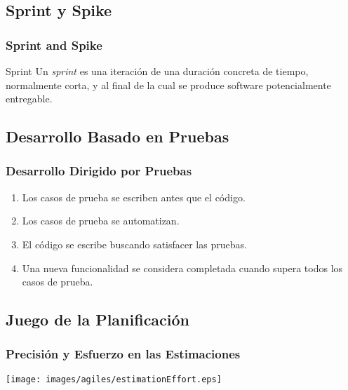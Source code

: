 \documentclass[animated,a4paper,slidestop,xcolor=pst,blue]{beamer}
\begin{document}
\subsection{Sprint y Spike}

\begin{frame}[c]
    \frametitle{Sprint and Spike}
    \begin{block}{Sprint}
        Un \emph{sprint} es una iteración de una duración concreta de tiempo, normalmente corta, y al final de la cual se produce software potencialmente entregable.
    \end{block}
\end{frame}

\subsection{Desarrollo Basado en Pruebas}

\begin{frame}[c]
    \frametitle{Desarrollo Dirigido por Pruebas}
    \begin{enumerate}[<+->]
        \item Los casos de prueba se escriben antes que el código.
        \item Los casos de prueba se automatizan.
        \item El código se escribe buscando satisfacer las pruebas.
        \item Una nueva funcionalidad se considera completada cuando supera todos los casos de prueba.
    \end{enumerate}
\end{frame}

\subsection{Juego de la Planificación}

\begin{frame}[c]
    \frametitle{Precisión y Esfuerzo en las Estimaciones}
    \begin{center}
        \texttt{[image: images/agiles/estimationEffort.eps]}
    \end{center}
\end{frame}
\end{document}
